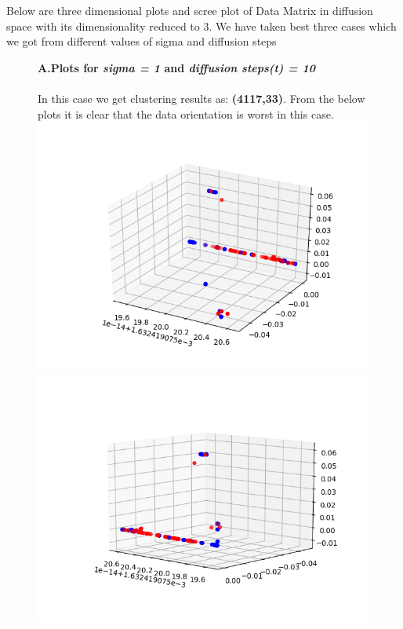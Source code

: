 \documentclass[12pt]{scrartcl}
\begin{document}
\newpage
Below are three dimensional plots and scree plot of Data Matrix in diffusion space with its dimensionality reduced to 3. We have taken best three cases which we got from different values of sigma and diffusion steps
\begin{figure}[h]
\textbf{A.\quad Plots for \textit{sigma = 1} and \textit{diffusion steps(t) = 10}}
\\\\
In this case we get clustering results as: \textbf{(4117,33)}. From the below plots it is clear that the data orientation is worst in this case.\\    		
    		\includegraphics[scale=0.5]{1_10.png}
    		\includegraphics[scale=0.5]{1_10_.png}
    		
\end{figure}
\end{document}

